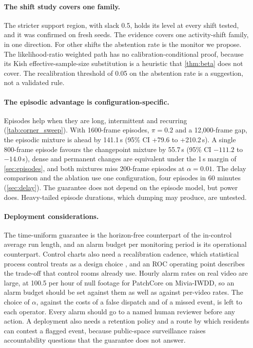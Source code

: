 \paragraph{The shift study covers one family.}
The stricter support region, with slack 0.5, holds its level at every shift tested, and it was confirmed on fresh seeds. The evidence covers one activity-shift family, in one direction. For other shifts the abstention rate is the monitor we propose. The likelihood-ratio weighted path has no calibration-conditional proof, because its Kish effective-sample-size substitution is a heuristic that \cref{thm:beta} does not cover. The recalibration threshold of 0.05 on the abstention rate is a suggestion, not a validated rule.

\paragraph{The episodic advantage is configuration-specific.}
Episodes help when they are long, intermittent and recurring (\cref{tab:corner_sweep}). With 1600-frame episodes, $\pi=0.2$ and a 12{,}000-frame gap, the episodic mixture is ahead by 141.1\,s (95\% CI +79.6 to +210.2\,s). A single 800-frame episode favours the changepoint mixture by 55.7\,s (95\% CI $-111.2$ to $-14.0$\,s), dense and permanent changes are equivalent under the 1\,s margin of \cref{sec:episodes}, and both mixtures miss 200-frame episodes at $\alpha=0.01$. The delay comparison and the ablation use one configuration, four episodes in 60 minutes (\cref{sec:delay}). The guarantee does not depend on the episode model, but power does. Heavy-tailed episode durations, which dumping may produce, are untested.

\paragraph{Deployment considerations.}
The time-uniform guarantee is the horizon-free counterpart of the in-control average run length, and an alarm budget per monitoring period is its operational counterpart. Control charts also need a recalibration cadence, which statistical process control treats as a design choice \citep{montgomery2020introduction}, and an ROC operating point \citep{fawcett2006introduction} describes the trade-off that control rooms already use. Hourly alarm rates on real video are large, at 100.5 per hour of null footage for PatchCore on Mivia-IWDD, so an alarm budget should be set against them as well as against per-video rates. The choice of $\alpha$, against the costs of a false dispatch and of a missed event, is left to each operator. Every alarm should go to a named human reviewer before any action. A deployment also needs a retention policy and a route by which residents can contest a flagged event, because public-space surveillance raises accountability questions that the guarantee does not answer.
